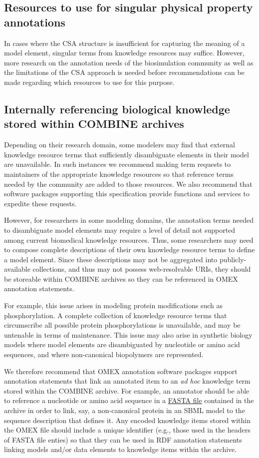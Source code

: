 \documentclass[pdftex,rgb,dvipsnames,svgnames,hyperref,table]{report}
\begin{document}
\subsection{Resources to use for singular physical property annotations}
In cases where the CSA structure is insufficient for capturing the meaning of a model element, singular terms from knowledge resources may suffice. However, more research on the annotation needs of the biosimulation community as well as the limitations of the CSA approach is needed before recommendations can be made regarding which resources to use for this purpose.

\subsection{Internally referencing biological knowledge stored within COMBINE archives}
Depending on their research domain, some modelers may find that external knowledge resource terms that sufficiently disambiguate elements in their model are unavailable. In such instances we recommend making term requests to maintainers of the appropriate knowledge resources so that reference terms needed by the community are added to those resources. We also recommend that software packages supporting this specification provide functions and services to expedite these requests.

However, for researchers in some modeling domains, the annotation terms needed to disambiguate model elements may require a level of detail not supported among current biomedical knowledge resources. Thus, some researchers may need to compose complete descriptions of their own knowledge resource terms to define a model element. Since these descriptions may not be aggregated into publicly-available collections, and thus may not possess web-resolvable URIs, they should be storeable within COMBINE archives so they can be referenced in OMEX annotation statements.

For example, this issue arises in modeling protein modifications such as phosphorylation. A complete collection of knowledge resource terms that circumscribe all possible protein phosphorylations is unavailable, and may be untenable in terms of maintenance. This issue may also arise in synthetic biology models where model elements are disambiguated by nucleotide or amino acid sequences, and where non-canonical biopolymers are represented.

We therefore recommend that OMEX annotation software packages support annotation statements that link an annotated item to an \textit{ad hoc} knowledge term stored within the COMBINE archive. For example, an annotator should be able to reference a nucleotide or amino acid sequence in a \href{https://en.wikipedia.org/wiki/FASTA_format}{FASTA file} contained in the archive in order to link, say, a non-canonical protein in an SBML model to the sequence description that defines it. Any encoded knowledge items stored within the OMEX file should include a unique identifier (e.g., those used in the headers of FASTA file enties) so that they can be used in RDF annotation statements linking models and/or data elements to knowledge items within the archive. 
\end{document}
